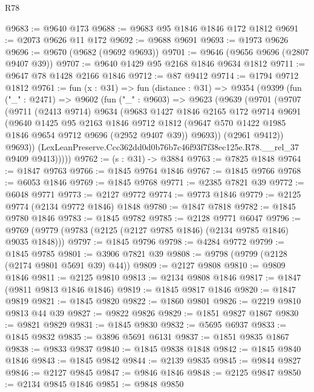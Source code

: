 \begin{lexlean}{R78}
\begin{coremodule}
@9683 := @9640 @173
@9688 := @9683 @95 @1846 @1846 @172 @1812
@9691 := @2073 @9626 @11 @172
@9692 := @9688 @9691
@9693 := @1973 @9626
@9696 := @9670 (@9682 (@9692 @9693))
@9701 := @9646 (@9656 @9696 (@2807 @9407 @39))
@9707 := @9640 @1429 @95 @2168 @1846 @9634 @1812
@9711 := @9647 @78 @1428 @2166 @1846
@9712 := @87 @9412
@9714 := @1794 @9712 @1812
@9761 := fun (x : @31) =>
  fun (distance : @31) =>
  @9354
    (@9399
      (fun ("_" : @2471) =>
      @9602
        (fun ("_" : @9603) =>
        @9623
          (@9639
            (@9701
              (@9707
                (@9711
                  (@2413 @9714)
                  @9634
                  (@9683
                    @1427
                    @1846
                    @2165
                    @172
                    @9714
                    @9691
                    (@9640
                      @1425
                      @95
                      @2163
                      @1846
                      @9712
                      @1812
                      (@9647 @570 @1422 @1985 @1846 @9654 @9712 @9696 (@2952 @9407 @39))
                      @9693))
                  (@2961 @9412))
                @9693))
            (LexLeanPreserve.Ccc362dd0d0b76b7c46f93f7f38ec125e.R78.__rel_37 @9409 @9413)))))
@9762 := (s : @31) -> @3884
@9763 := @7825 @1848
@9764 := @1847 @9763
@9766 := @1845 @9764 @1846
@9767 := @1845 @9766
@9768 := @6053 @1846
@9769 := @1845 @9768
@9771 := @2385 @7821 @39
@9772 := @6048 @9771
@9773 := @2127 @9772
@9774 := @9773 @1846
@9779 := @2125 @9774 (@2134 @9772 @1846) @1848
@9780 := @1847 @7818
@9782 := @1845 @9780 @1846
@9783 := @1845 @9782
@9785 := @2128 @9771 @6047
@9796 := @9769 (@9779 (@9783 (@2125 (@2127 @9785 @1846) (@2134 @9785 @1846) @9035 @1848)))
@9797 := @1845 @9796
@9798 := @4284 @9772
@9799 := @1845 @9785
@9801 := @3906 @7821 @39
@9808 := @9798 (@9799 (@2128 (@2174 @9801 @5691 @39) @44))
@9809 := @2127 @9808
@9810 := @9809 @1846
@9811 := @2125 @9810
@9813 := @2134 @9808 @1846
@9817 := @1847 (@9811 @9813 @1846 @1846)
@9819 := @1845 @9817 @1846
@9820 := @1847 @9819
@9821 := @1845 @9820
@9822 := @1860 @9801
@9826 := @2219 @9810 @9813 @44 @39
@9827 := @9822 @9826
@9829 := @1851 @9827 @1867
@9830 := @9821 @9829
@9831 := @1845 @9830
@9832 := @5695 @6937
@9833 := @1845 @9832
@9835 := @3896 @5691 @6131
@9837 := @1851 @9835 @1867
@9838 := @9833 @9837
@9840 := @1845 @9838 @1848
@9842 := @1845 @9840 @1846
@9843 := @1845 @9842
@9844 := @2139 @9835
@9845 := @9844 @9827
@9846 := @2127 @9845
@9847 := @9846 @1846
@9848 := @2125 @9847
@9850 := @2134 @9845 @1846
@9851 := @9848 @9850

\end{coremodule}
\end{lexlean}
